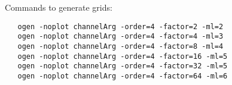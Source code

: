 Commands to generate grids:
\begin{verbatim}
   ogen -noplot channelArg -order=4 -factor=2 -ml=2
   ogen -noplot channelArg -order=4 -factor=4 -ml=3
   ogen -noplot channelArg -order=4 -factor=8 -ml=4
   ogen -noplot channelArg -order=4 -factor=16 -ml=5
   ogen -noplot channelArg -order=4 -factor=32 -ml=5
   ogen -noplot channelArg -order=4 -factor=64 -ml=6
\end{verbatim}
